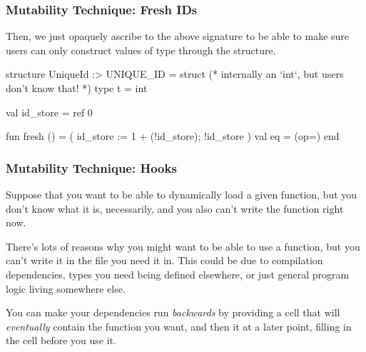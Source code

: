 \documentclass[aspectratio=169]{beamer}
\begin{document}
\begin{frame}[fragile]
  \frametitle{Mutability Technique: Fresh IDs}

  Then, we just opaquely ascribe to the above signature to be able to
  make sure users can only construct values of type 
  through the structure.

  \pause
  \vspace{\fill}

  \begin{codeblock}
    structure UniqueId :> UNIQUE_ID =
      struct
        (* internally an `int`, but users don't know that! *)
        type t = int

        val id_store = ref 0

        fun fresh () =
          ( id_store := 1 + (!id_store);
            !id_store
          )
        val eq = (op=)
    end
  \end{codeblock}
\end{frame}

\begin{frame}[fragile]
  \frametitle{Mutability Technique: Hooks}

  Suppose that you want to be able to dynamically load a given function,
  but you don't know what it is, necessarily, and you also can't write the
  function right now.

  \pause
  \vspace{\fill}

  There's lots of reasons why you might want to be able to use a function,
  but you can't write it in the file you need it in. This could be due to
  compilation dependencies, types you need being defined elsewhere, or just
  general program logic living somewhere else.

  \pause
  \vspace{\fill}

  You can make your dependencies run \textit{backwards} by providing a
   cell that will \textit{eventually} contain the function you
  want, and then  it at a later point, filling in
  the cell before you use it.
\end{frame}
\end{document}
